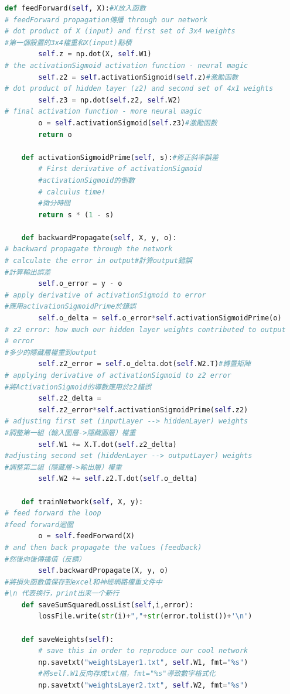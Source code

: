 \documentclass[12pt,a4paper]{article}
\begin{document}
\begin{flushleft}
\begin{lstlisting}[language=python]
    def feedForward(self, X):#X放入函數
# feedForward propagation傳播 through our network
# dot product of X (input) and first set of 3x4 weights
#第一個設置的3x4權重和X(input)點積
        self.z = np.dot(X, self.W1)
# the activationSigmoid activation function - neural magic
        self.z2 = self.activationSigmoid(self.z)#激勵函數
# dot product of hidden layer (z2) and second set of 4x1 weights
        self.z3 = np.dot(self.z2, self.W2)
# final activation function - more neural magic
        o = self.activationSigmoid(self.z3)#激勵函數
        return o

    def activationSigmoidPrime(self, s):#修正斜率誤差
        # First derivative of activationSigmoid
        #activationSigmoid的倒數
        # calculus time!
        #微分時間
        return s * (1 - s)

    def backwardPropagate(self, X, y, o):
# backward propagate through the network
# calculate the error in output#計算output錯誤
#計算輸出誤差
        self.o_error = y - o 
# apply derivative of activationSigmoid to error
#應用activationSigmoidPrime於錯誤
        self.o_delta = self.o_error*self.activationSigmoidPrime(o)
# z2 error: how much our hidden layer weights contributed to output
# error
#多少的隱藏層權重到output
        self.z2_error = self.o_delta.dot(self.W2.T)#轉置矩陣
# applying derivative of activationSigmoid to z2 error
#將ActivationSigmoid的導數應用於z2錯誤
        self.z2_delta = 
        self.z2_error*self.activationSigmoidPrime(self.z2)
# adjusting first set (inputLayer --> hiddenLayer) weights
#調整第一組（輸入圖層->隱藏圖層）權重
        self.W1 += X.T.dot(self.z2_delta)
#adjusting second set (hiddenLayer --> outputLayer) weights
#調整第二組（隱藏層->輸出層）權重
        self.W2 += self.z2.T.dot(self.o_delta)
    
    def trainNetwork(self, X, y):
# feed forward the loop
#feed forward迴圈
        o = self.feedForward(X)
# and then back propagate the values (feedback)
#然後向後傳播值（反饋）
        self.backwardPropagate(X, y, o)
#將損失函數值保存到excel和神經網路權重文件中 
#\n 代表换行，print出来一个新行
    def saveSumSquaredLossList(self,i,error):
        lossFile.write(str(i)+","+str(error.tolist())+'\n')
        
    def saveWeights(self):
        # save this in order to reproduce our cool network
        np.savetxt("weightsLayer1.txt", self.W1, fmt="%s")
        #將self.W1反向存成txt檔，fmt="%s"導致數字格式化
        np.savetxt("weightsLayer2.txt", self.W2, fmt="%s")
        

\end{lstlisting}
\end{flushleft}
\end{document}
